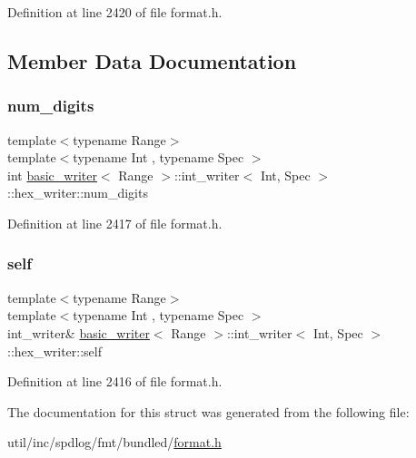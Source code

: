 Definition at line 2420 of file format.\+h.



\subsection{Member Data Documentation}
\mbox{\label{structbasic__writer_1_1int__writer_1_1hex__writer_a34a4c667e65b0d985a2c9debe9ed3a51}} 
\subsubsection{\texorpdfstring{num\+\_\+digits}{num\_digits}}
{\footnotesize\ttfamily template$<$typename Range$>$ \\
template$<$typename Int , typename Spec $>$ \\
int \hyperlink{classbasic__writer}{basic\+\_\+writer}$<$ Range $>$\+::int\+\_\+writer$<$ Int, Spec $>$\+::hex\+\_\+writer\+::num\+\_\+digits}



Definition at line 2417 of file format.\+h.

\mbox{\label{structbasic__writer_1_1int__writer_1_1hex__writer_a214346e34f1462ad5a119879d3e9063e}} 
\subsubsection{\texorpdfstring{self}{self}}
{\footnotesize\ttfamily template$<$typename Range$>$ \\
template$<$typename Int , typename Spec $>$ \\
int\+\_\+writer\& \hyperlink{classbasic__writer}{basic\+\_\+writer}$<$ Range $>$\+::int\+\_\+writer$<$ Int, Spec $>$\+::hex\+\_\+writer\+::self}



Definition at line 2416 of file format.\+h.



The documentation for this struct was generated from the following file\+:\begin{DoxyCompactItemize}
\item 
util/inc/spdlog/fmt/bundled/\hyperlink{format_8h}{format.\+h}\end{DoxyCompactItemize}
